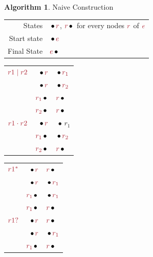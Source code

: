 \documentclass[10pt, landscape]{article}
\theoremstyle{definition}
\newtheorem{algorithm}{Algorithm}[section]
\newcommand{\Bul}{\,\bullet\,}
\newcommand{\termcolor}{NavyBlue}
\newcommand{\termEps}{\textcolor{\termcolor}{\epsilon}}
\begin{document}
\begin{multicols*}{3}
{  \begin{algorithm}{Naive Construction}

    \begin{tabular}{r l}
      States      & $\Left{r}$, $\Right{r}$ for every nodes $\Rx{r}$ of $\Rx{e}$ \\
      Start state & $\Left{e}$ \\
      Final State & $\Right{e}$
    \end{tabular}

    \begin{multicols}{2}[\setlength{\columnseprule}{0pt}]
      \begin{tabular}{l @{ (} r @{, $\termEps$ , } l @{)}}
        $\Rx{r1 \mid r2}$ & $\Left{r}$      & $\Left {r_{1}}$ \\
                          & $\Left{r}$      & $\Left{r_{2}}$ \\
                          & $\Right{r_{1}}$ & $\Right{r}$ \\
                          & $\Right{r_{2}}$ & $\Right{r}$ \\
        \midrule
        $\Rx{r1 \cdot r2}$ & $\Left{r}$      & $\Bul r_{1}$ \\
                           & $\Right{r_{1}}$ & $\Left{r_{2}}$ \\
                           & $\Right{r_{2}}$ & $\Right{r}$ \\
      \end{tabular}

      \begin{tabular}{l @{ (} r @{, $\termEps$ , } l @{) }}
        $\Rx{r1^{*}}$ & $\Left{r}$      & $\Right{r}$ \\
                      & $\Left{r}$      & $\Left{r_{1}}$ \\
                      & $\Right{r_{1}}$ & $\Left{r_{1}}$ \\
                      & $\Right{r_{1}}$ & $\Right{r}$ \\
        \midrule
        $\Rx{r1{?}}$ & $\Left{r}    $ & $\Right{r}$ \\
                     & $\Left{r}    $ & $\Left{r_{1}}$ \\
                     & $\Right{r_{1}}$ & $\Right{r}$ \\
      \end{tabular}

    \end{multicols}
  \end{algorithm}

}
\end{multicols*}
\end{document}
